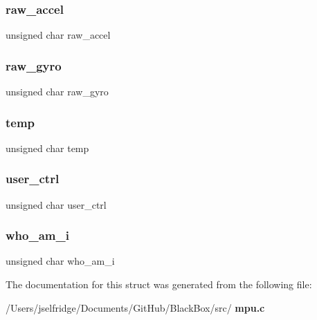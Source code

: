 \mbox{\label{structgyro__reg__s_a3a78e67f9066b6b8601f375fcaadf005}} 
\subsubsection{raw\+\_\+accel}
{\footnotesize\ttfamily unsigned char raw\+\_\+accel}

\mbox{\label{structgyro__reg__s_a1366c90aec04a4e1d212de76d3f0b6cc}} 
\subsubsection{raw\+\_\+gyro}
{\footnotesize\ttfamily unsigned char raw\+\_\+gyro}

\mbox{\label{structgyro__reg__s_abe413cb96d839cbe31417aa52d920f21}} 
\subsubsection{temp}
{\footnotesize\ttfamily unsigned char temp}

\mbox{\label{structgyro__reg__s_ad8384710853dc1f9580b9ff19e87efbc}} 
\subsubsection{user\+\_\+ctrl}
{\footnotesize\ttfamily unsigned char user\+\_\+ctrl}

\mbox{\label{structgyro__reg__s_aa52d78bb2b62fee23a0b759e545dba4b}} 
\subsubsection{who\+\_\+am\+\_\+i}
{\footnotesize\ttfamily unsigned char who\+\_\+am\+\_\+i}



The documentation for this struct was generated from the following file\+:\begin{DoxyCompactItemize}
\item 
/\+Users/jselfridge/\+Documents/\+Git\+Hub/\+Black\+Box/src/\textbf{ mpu.\+c}\end{DoxyCompactItemize}
